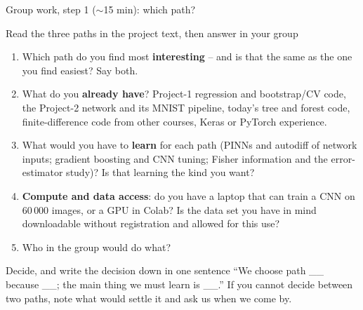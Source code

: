 \documentclass[10pt,aspectratio=169]{beamer}
\begin{document}
\begin{frame}{Group work, step 1 ($\sim$15 min): which path?}
\footnotesize
\begin{block}{Read the three paths in the project text, then answer in your group}
\begin{enumerate}
  \item Which path do you find most \textbf{interesting} -- and is that the
        same as the one you find easiest?  Say both.
  \item What do you \textbf{already have}?  Project-1 regression and
        bootstrap/CV code, the Project-2 network and its MNIST pipeline,
        today's tree and forest code, finite-difference code from other
        courses, Keras or PyTorch experience.
  \item What would you have to \textbf{learn} for each path (PINNs and
        autodiff of network inputs; gradient boosting and CNN tuning;
        Fisher information and the error-estimator study)?  Is that
        learning the kind you want?
  \item \textbf{Compute and data access}: do you have a laptop that can
        train a CNN on $60\,000$ images, or a GPU in Colab?  Is the data set
        you have in mind downloadable without registration and allowed for
        this use?
  \item Who in the group would do what?
\end{enumerate}
\end{block}
\begin{block}{Decide, and write the decision down in one sentence}
``We choose path \_\_ because \_\_; the main thing we must learn is \_\_.''
If you cannot decide between two paths, note what would settle it and ask
us when we come by.
\end{block}
\end{frame}
\end{document}

